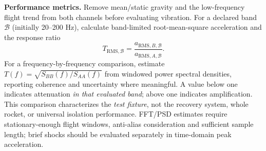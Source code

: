 \textbf{Performance metrics.} Remove mean/static gravity and the low-frequency flight trend from both channels before evaluating vibration. For a declared band $\mathcal B$ (initially 20--200 Hz), calculate band-limited root-mean-square acceleration and the response ratio
\begin{equation}
T_{\mathrm{RMS},\mathcal B}=\frac{a_{\mathrm{RMS},B,\mathcal B}}{a_{\mathrm{RMS},A,\mathcal B}}.
\end{equation}
For a frequency-by-frequency comparison, estimate $T(f)=\sqrt{S_{BB}(f)/S_{AA}(f)}$ from windowed power spectral densities, reporting coherence and uncertainty where meaningful. A value below one indicates attenuation \emph{in that evaluated band}; above one indicates amplification. This comparison characterizes the \emph{test fixture}, not the recovery system, whole rocket, or universal isolation performance. FFT/PSD estimates require stationary-enough flight windows, anti-alias consideration and sufficient sample length; brief shocks should be evaluated separately in time-domain peak acceleration.

